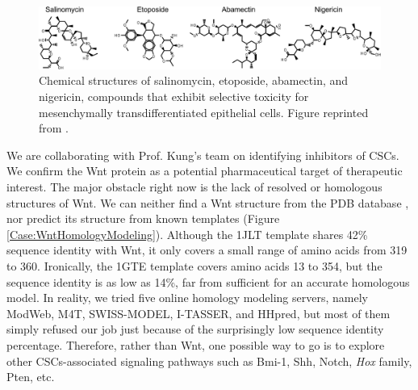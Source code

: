 \begin{figure}
\centering
\includegraphics[width=\linewidth]{Case/SalinomycinEtoposideAbamectinNigericin.png}
\caption{Chemical structures of salinomycin, etoposide, abamectin, and nigericin, compounds that exhibit selective toxicity for mesenchymally transdifferentiated epithelial cells. Figure reprinted from \citep{1147}.}
\label{Case:SalinomycinEtoposideAbamectinNigericin}
\end{figure}

We are collaborating with Prof. Kung's team on identifying inhibitors of CSCs. We confirm the Wnt protein as a potential pharmaceutical target of therapeutic interest. The major obstacle right now is the lack of resolved or homologous structures of Wnt. We can neither find a Wnt structure from the PDB database \citep{540,537}, nor predict its structure from known templates (Figure \ref{Case:WntHomologyModeling}). Although the 1JLT template shares 42\% sequence identity with Wnt, it only covers a small range of amino acids from 319 to 360. Ironically, the 1GTE template covers amino acids 13 to 354, but the sequence identity is as low as 14\%, far from sufficient for an accurate homologous model. In reality, we tried five online homology modeling servers, namely ModWeb, M4T, SWISS-MODEL, I-TASSER, and HHpred, but most of them simply refused our job just because of the surprisingly low sequence identity percentage. Therefore, rather than Wnt, one possible way to go is to explore other CSCs-associated signaling pathways such as Bmi-1, Shh, Notch, \textit{Hox} family, Pten, etc.

